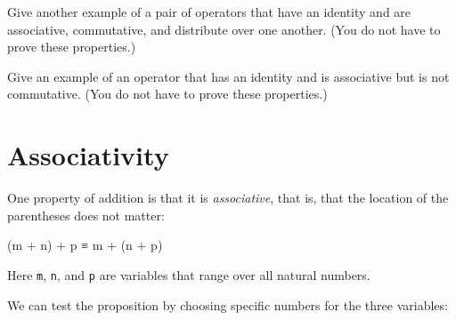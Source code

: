 Give another example of a pair of operators that have an identity and
are associative, commutative, and distribute over one another. (You do
not have to prove these properties.)

Give an example of an operator that has an identity and is associative
but is not commutative. (You do not have to prove these properties.)

\hypertarget{associativity}{%
\section{Associativity}\label{associativity}}

One property of addition is that it is \emph{associative}, that is, that
the location of the parentheses does not matter:

\begin{myDisplay}
(m + n) + p ≡ m + (n + p)
\end{myDisplay}

Here \texttt{m}, \texttt{n}, and \texttt{p} are variables that range
over all natural numbers.

We can test the proposition by choosing specific numbers for the three
variables:

